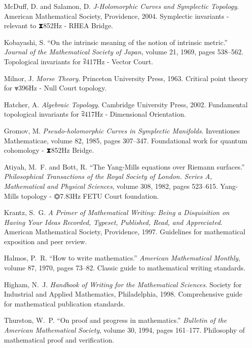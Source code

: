 McDuff, D. and Salamon, D.
\textit{J-Holomorphic Curves and Symplectic Topology}.
American Mathematical Society, Providence, 2004.
Symplectic invariants - relevant to ⧗852Hz - RHEA Bridge.

Kobayashi, S.
``On the intrinsic meaning of the notion of intrinsic metric.''
\textit{Journal of the Mathematical Society of Japan}, volume 21, 1969, pages 538--562.
Topological invariants for ⫀417Hz - Vector Court.

Milnor, J.
\textit{Morse Theory}.
Princeton University Press, 1963.
Critical point theory for ⩔396Hz - Null Court topology.

Hatcher, A.
\textit{Algebraic Topology}.
Cambridge University Press, 2002.
Fundamental topological invariants for ⫀417Hz - Dimensional Orientation.

Gromov, M.
\textit{Pseudo-holomorphic Curves in Symplectic Manifolds}.
Inventiones Mathematicae, volume 82, 1985, pages 307--347.
Foundational work for quantum cohomology - ⧗852Hz Bridge.

Atiyah, M.~F. and Bott, R.
``The Yang-Mills equations over Riemann surfaces.''
\textit{Philosophical Transactions of the Royal Society of London. Series A, Mathematical and Physical Sciences}, volume 308, 1982, pages 523--615.
Yang-Mills topology - ⏣7.83Hz FETU Court foundation.


Krantz, S.~G.
\textit{A Primer of Mathematical Writing: Being a Disquisition on Having Your Ideas Recorded, Typeset, Published, Read, and Appreciated}.
American Mathematical Society, Providence, 1997.
Guidelines for mathematical exposition and peer review.

Halmos, P.~R.
``How to write mathematics.''
\textit{American Mathematical Monthly}, volume 87, 1970, pages 73--82.
Classic guide to mathematical writing standards.

Higham, N.~J.
\textit{Handbook of Writing for the Mathematical Sciences}.
Society for Industrial and Applied Mathematics, Philadelphia, 1998.
Comprehensive guide for mathematical publication standards.

Thurston, W.~P.
``On proof and progress in mathematics.''
\textit{Bulletin of the American Mathematical Society}, volume 30, 1994, pages 161--177.
Philosophy of mathematical proof and verification.

